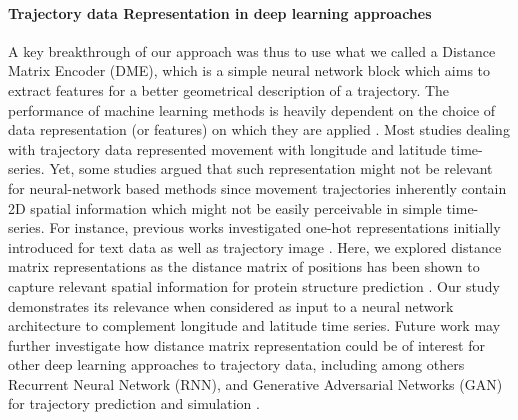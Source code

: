 \documentclass{article}
\begin{document}
\paragraph{Trajectory data Representation in deep learning approaches}
A key breakthrough of our approach was thus to use what we called a Distance Matrix Encoder (DME), which is a simple neural network block which aims to extract features for a better geometrical description of a trajectory.
The performance of machine learning methods is heavily dependent on the choice of data representation (or features) on which they are applied \citep{bengio_representation_2014}.
Most studies dealing with trajectory data represented movement with longitude and latitude time-series. Yet, some studies argued that such representation might not be relevant for neural-network based methods since movement trajectories inherently contain 2D spatial information which might not be easily perceivable in simple time-series. For instance, previous works  investigated one-hot representations initially introduced for text data  \citep{nguyen_geotracknet-maritime_2021} as well as trajectory image \citep{endo_classifying_2016}. Here, we explored distance matrix representations as the distance matrix of positions has been shown to capture relevant spatial information for protein structure prediction \citep{senior_improved_2020, xu_analysis_2019}. Our study  demonstrates its relevance when considered as input to a neural network architecture to complement longitude and latitude time series. Future work may further investigate how distance matrix representation could be of interest for other deep learning approaches to trajectory data, including among others Recurrent Neural Network (RNN), and Generative Adversarial Networks (GAN) for trajectory prediction and simulation \citep{ardakani_encoding_2017,goodfellow_generative_2016,isola_image--image_2018,rew_animal_2019}.
\end{document}
